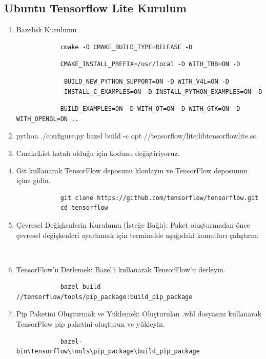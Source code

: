 \documentclass[12pt,a4paper]{article}
\begin{document}
\begin{enumerate}
\begin{enumerate}
		\end{enumerate}
		\pagebreak
\begin{center}
	\section*{Ubuntu Tensorflow Lite Kurulum }
\end{center}	 

	\begin{enumerate}
		\item Bazelisk Kurulumu
		\begin{verbatim}
			cmake -D CMAKE_BUILD_TYPE=RELEASE -D
		\end{verbatim} 
			\begin{verbatim}
			CMAKE_INSTALL_PREFIX=/usr/local -D WITH_TBB=ON -D
		\end{verbatim}
		\begin{verbatim}
			 BUILD_NEW_PYTHON_SUPPORT=ON -D WITH_V4L=ON -D
			 INSTALL_C_EXAMPLES=ON -D INSTALL_PYTHON_EXAMPLES=ON -D 
		\end{verbatim}
		\begin{verbatim}
			BUILD_EXAMPLES=ON -D WITH_QT=ON -D WITH_GTK=ON -D WITH_OPENGL=ON ..
		\end{verbatim}
		 \item python ./configure.py
		 bazel build -c opt //tensorflow/lite:libtensorflowlite.so
		
		
		
		\item CmakeList hatalı olduğu için kodunu değiştiriyoruz.
		
		
		
		\item 		Git kullanarak TensorFlow deposunu klonlayın ve TensorFlow deposunun içine gidin.
		
		\begin{verbatim}
			git clone https://github.com/tensorflow/tensorflow.git
			cd tensorflow
		\end{verbatim}
		\item Çevresel Değişkenlerin Kurulumu (İsteğe Bağlı):
		Paket oluşturmadan önce çevresel değişkenleri ayarlamak için terminalde aşağıdaki komutları çalıştırın:
		\begin{verbatim}
		
		\end{verbatim}
		\item TensorFlow'u Derlemek:
		Bazel'i kullanarak TensorFlow'u derleyin.
		\begin{verbatim}
			bazel build //tensorflow/tools/pip_package:build_pip_package
		\end{verbatim}
		\item Pip Paketini Oluşturmak ve Yüklemek:
		Oluşturulan .whl dosyasını kullanarak TensorFlow pip paketini oluşturun ve yükleyin.
		\begin{verbatim}
			bazel-bin\tensorflow\tools\pip_package\build_pip_package
		   

\end{verbatim}
\end{enumerate}
\end{enumerate}
\end{document}
